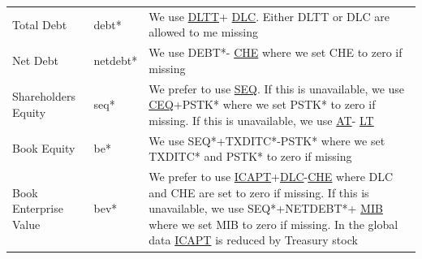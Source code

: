 \documentclass[12pt,title,fleqn]{article}
\begin{document}
{\begin{longtable}{@{\extracolsep{\fill}}|m{5cm}|l|m{8cm}|@{}}
	Total Debt & debt\mbox{*} & We use 
	\href{https://wrds-www.wharton.upenn.edu/data-dictionary/form_metadata/comp_na_daily_all_funda_balancesheetitems/DLTT/}{DLTT}+
	\href{https://wrds-www.wharton.upenn.edu/data-dictionary/form_metadata/comp_na_daily_all_funda_balancesheetitems/DLC/}{DLC}. Either DLTT or DLC are allowed to me missing\\
	
	Net Debt & netdebt\mbox{*} & We use DEBT\mbox{*}-
	\href{https://wrds-www.wharton.upenn.edu/data-dictionary/form_metadata/comp_na_daily_all_funda_balancesheetitems/CHE/}{CHE} where we set CHE to zero if missing \\
	
	Shareholders Equity & seq\mbox{*} & We prefer to use 
	\href{https://wrds-www.wharton.upenn.edu/data-dictionary/form_metadata/comp_na_daily_all_funda_balancesheetitems/SEQ/}{SEQ}. If this is unavailable, we use 
	\href{https://wrds-www.wharton.upenn.edu/data-dictionary/form_metadata/comp_na_daily_all_funda_balancesheetitems/CEQ/}{CEQ}+PSTK\mbox{*} where we set PSTK\mbox{*} to zero if missing. If this is unavailable, we use 
	\href{https://wrds-www.wharton.upenn.edu/data-dictionary/form_metadata/comp_na_daily_all_funda_balancesheetitems/AT/}{AT}-
	\href{https://wrds-www.wharton.upenn.edu/data-dictionary/form_metadata/comp_na_daily_all_funda_balancesheetitems/LT/}{LT} \\
	
	Book Equity & be\mbox{*} & We use SEQ\mbox{*}+TXDITC\mbox{*}-PSTK\mbox{*} where we set TXDITC\mbox{*} and PSTK\mbox{*} to zero if missing \\
	
	Book Enterprise Value & bev\mbox{*} & We prefer to use 
	\href{https://wrds-www.wharton.upenn.edu/data-dictionary/form_metadata/comp_na_daily_all_funda_balancesheetitems/ICAPT/}{ICAPT}+\href{https://wrds-www.wharton.upenn.edu/data-dictionary/form_metadata/comp_na_daily_all_funda_balancesheetitems/DLC/}{DLC}-\href{https://wrds-www.wharton.upenn.edu/data-dictionary/form_metadata/comp_na_daily_all_funda_balancesheetitems/CHE/}{CHE} where DLC and CHE are set to zero if missing. If this is unavailable, we use SEQ\mbox{*}+NETDEBT\mbox{*}+
	\href{https://wrds-www.wharton.upenn.edu/data-dictionary/form_metadata/comp_na_daily_all_funda_balancesheetitems/MIB/}{MIB} where we set MIB to zero if missing. In the global data \href{https://wrds-www.wharton.upenn.edu/data-dictionary/form_metadata/comp_na_daily_all_funda_balancesheetitems/ICAPT/}{ICAPT} is reduced by Treasury stock \\
	

\end{longtable}}
\end{document}
